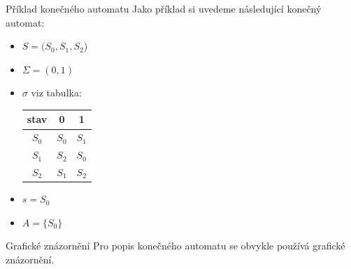 \documentclass{beamer}
\begin{document}
\begin{frame}{Příklad konečného automatu}
Jako příklad si uvedeme následující konečný automat:
\begin{itemize}
	\item{$S = (S_0, S_1, S_2$)}
	\item{$\Sigma = (0, 1)$}
	\item{$\sigma$ viz tabulka:
	\begin{table}[h]
	\begin{tabular}{|c|c|c|}
	\hline
	\textbf{stav}  & \textbf{0} & \textbf{1} \\ \hline
	$S_0$ & $S_0$      & $S_1$      \\ \hline
	$S_1$ & $S_2$      & $S_0$      \\ \hline
	$S_2$ & $S_1$      & $S_2$      \\ \hline
	\end{tabular}
	\end{table}
	}

	\item{$s = S_0$}
	\item{$A = \{S_0\}$}
\end{itemize}
\end{frame}

\begin{frame}{Grafické znázornění}
Pro popis konečného automatu se obvykle používá grafické znázornění.
	\begin{figure}[h]
	\begin{center}
	\end{center}
	\end{figure}
\end{frame}
\end{document}

